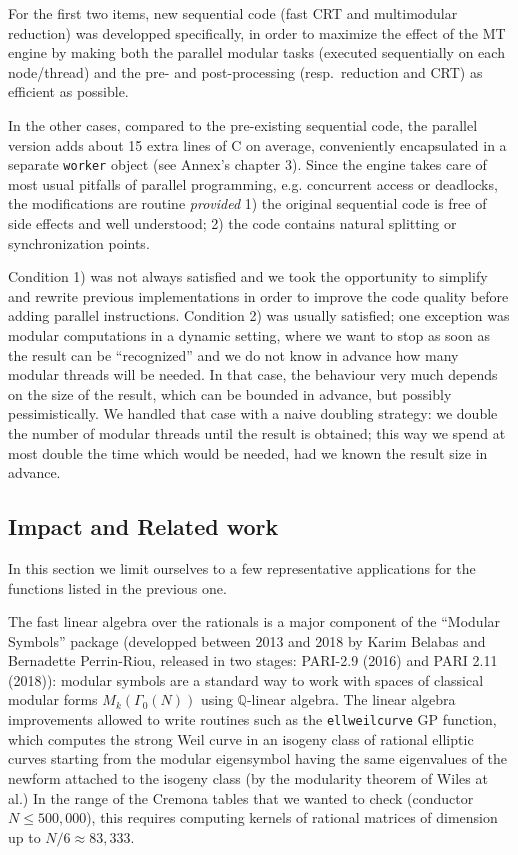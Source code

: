 \documentclass{deliverablereport}
\begin{document}
For the first two items, new sequential code (fast CRT and multimodular
reduction) was developped specifically, in order to maximize the effect of
the MT engine by making both the parallel modular tasks (executed
sequentially on each node/thread) and the pre- and post-processing
(resp.~reduction and CRT) as efficient as possible.

In the other cases, compared to the pre-existing sequential code, the
parallel version adds about 15 extra lines of C on average, conveniently
encapsulated in a separate \texttt{worker} object (see Annex's chapter 3).
Since the engine takes care of most usual pitfalls of parallel programming,
e.g. concurrent access or deadlocks, the modifications are routine
\emph{provided} 1) the original sequential code is free of side effects and
well understood; 2) the code contains natural splitting or synchronization
points.

Condition 1) was not always satisfied and we took the opportunity to simplify
and rewrite previous implementations in order to improve the code quality
before adding parallel instructions. Condition 2) was usually satisfied; one
exception was modular computations in a dynamic setting, where we want to
stop as soon as the result can be ``recognized'' and we do not know in
advance how many modular threads will be needed. In that case, the behaviour
very much depends on the size of the result, which can be bounded in advance,
but possibly pessimistically. We handled that case with a naive doubling
strategy: we double the number of modular threads until the result is
obtained; this way we spend at most double the time which would be needed,
had we known the result size in advance.

\subsection{Impact and Related work}

In this section we limit ourselves to a few representative applications
for the functions listed in the previous one.

The fast linear algebra over the rationals is a major component
of the ``Modular Symbols'' package (developped between 2013 and 2018
by Karim Belabas and Bernadette Perrin-Riou, released in two stages: PARI-2.9
(2016) and PARI 2.11 (2018)): modular symbols are a standard way to work with
spaces of classical modular forms $M_k(\Gamma_0(N))$ using
$\mathbb{Q}$-linear algebra. The linear algebra improvements allowed to write
routines such as the \texttt{ellweilcurve} GP function, which computes the
strong Weil curve in an isogeny class of rational elliptic curves starting
from the modular eigensymbol having the same eigenvalues of the newform
attached to the isogeny class (by the modularity theorem of Wiles at al.) In
the range of the Cremona tables that we wanted to check (conductor $N \leq
500,000$), this requires computing kernels of rational matrices of dimension
up to $N / 6\approx 83,333$.
\end{document}
